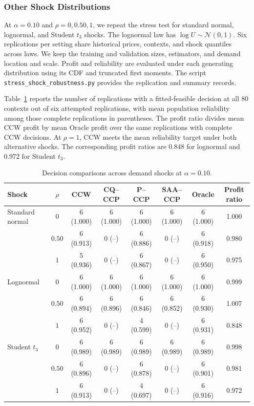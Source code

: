 \subsubsection{Other Shock Distributions}\label{app:stress-shock-robustness}

At \(\alpha=0.10\) and \(\rho=0,0.50,1\), we repeat the stress test for standard normal, lognormal, and Student \(t_3\) shocks. The lognormal law has \(\log U\sim\mathcal N(0,1)\). Six replications per setting share historical prices, contexts, and shock quantiles across laws. We keep the training and validation sizes, estimators, and demand location and scale. Profit and reliability are evaluated under each generating distribution using its CDF and truncated first moments. The script \texttt{stress\_shock\_robustness.py} provides the replication and summary records.

Table~\ref{tab:stress-shock-robustness} reports the number of replications with a fitted-feasible decision at all 80 contexts out of six attempted replications, with mean population reliability among those complete replications in parentheses. The profit ratio divides mean CCW profit by mean Oracle profit over the same replications with complete CCW decisions. At \(\rho=1\), CCW meets the mean reliability target under both alternative shocks. The corresponding profit ratios are 0.848 for lognormal and 0.972 for Student \(t_3\).

\begin{table}[H]
\centering
\setlength{\tabcolsep}{4pt}
\caption{Decision comparisons across demand shocks at \(\alpha=0.10\).}\label{tab:stress-shock-robustness}
\small
\begin{tabular}{lccccccc}
\toprule
Shock & \(\rho\) & CCW & CQ--CCP & P--CCP & SAA--CCP & Oracle & Profit ratio \\
\midrule
Standard normal & \(0\) & 6 (1.000) & 6 (1.000) & 6 (1.000) & 6 (1.000) & 6 (1.000) & 1.000 \\
 & \(0.50\) & 6 (0.913) & 0 (--) & 6 (0.886) & 0 (--) & 6 (0.918) & 0.980 \\
 & \(1\) & 5 (0.936) & 0 (--) & 6 (0.867) & 0 (--) & 6 (0.950) & 0.975 \\
\addlinespace
Lognormal & \(0\) & 6 (1.000) & 6 (1.000) & 6 (1.000) & 6 (1.000) & 6 (1.000) & 0.999 \\
 & \(0.50\) & 6 (0.894) & 6 (0.896) & 6 (0.846) & 6 (0.852) & 6 (0.930) & 1.007 \\
 & \(1\) & 6 (0.952) & 0 (--) & 4 (0.599) & 0 (--) & 6 (0.931) & 0.848 \\
\addlinespace
Student \(t_3\) & \(0\) & 6 (0.989) & 6 (0.989) & 6 (0.989) & 6 (0.989) & 6 (0.989) & 0.998 \\
 & \(0.50\) & 6 (0.896) & 0 (--) & 6 (0.878) & 0 (--) & 6 (0.901) & 0.981 \\
 & \(1\) & 6 (0.913) & 0 (--) & 4 (0.697) & 0 (--) & 6 (0.916) & 0.972 \\
\bottomrule
\end{tabular}
\end{table}

